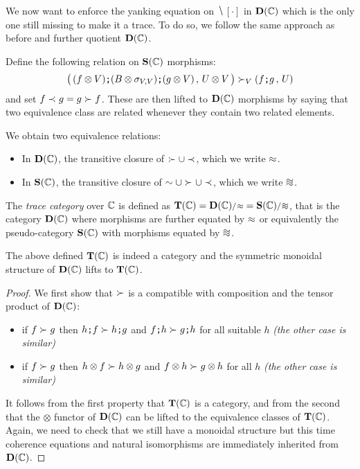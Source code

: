 

We now want to enforce the yanking equation on $\hide{}[\cdot]$ in $\mathbf D(\mathbb{C})$ which is the only one
still missing to make it a trace. To do so, we follow 
the same approach as
before and further quotient $\mathbf D(\mathbb{C})$.

\begin{definition}
	Define the following relation on $\mathbf S(\mathbb{C})$ morphisms:
	$$\big(\,(f\otimes V)\textbf{\tt;}(B\otimes\sigma_{V,V})\textbf{\tt;}(g\otimes V)\,,\, U\otimes V\,\big)
	\succ_{V} (f\textbf{\tt;} g\,,\,U) $$
	and set $f\prec_{}g=g\succ_{}f$. These are then lifted to $\mathbf D(\mathbb{C})$ morphisms by saying that two
	equivalence class are related whenever they contain two related elements.
	
	We obtain two equivalence relations:
	\begin{itemize}
		\item In $\mathbf D(\mathbb{C})$, the transitive closure of $\succ_{}\cup\prec_{}$, which we write $\approx$.
		\item In $\mathbf S(\mathbb{C})$, the transitive closure of $\sim\cup\succ_{}\cup\prec_{}$, which we write $\quo$.
	\end{itemize}
	The \emph{trace category} over $\mathbb{C}$ is defined as $\tra C=\quotient{\dial C}{\ye}
	=\quotient{\state C}{\quo}$,
	that is the category $\mathbf D(\mathbb{C})$ where morphisms are further equated by $\approx$ or equivalently
	the pseudo-category $\mathbf S(\mathbb{C})$ with morphisms equated by $\quo$.
\end{definition}




\begin{proposition}
	The above defined $\mathbf T(\mathbb{C})$ is indeed a category and
	the symmetric monoidal structure of $\mathbf D(\mathbb{C})$ lifts to $\mathbf T(\mathbb{C})$.
\end{proposition}

\begin{proof}
	We first show that $\succ_{}$ is a compatible with composition and the tensor product of $\mathbf D(\mathbb{C})$:
	\begin{itemize}
		\item if $f\succ_{}g$ then $h\textbf{\tt;} f\succ_{}h\textbf{\tt;} g$ and $f\textbf{\tt;} h\succ_{}g\textbf{\tt;} h$ for all suitable $h$
	\textit{(the other case is similar)}
		\item if $f\succ_{}g$ then $h\otimes f\succ_{}h\otimes g$ and $f\otimes h\succ_{}g\otimes h$ for all $h$
	\textit{(the other case is similar)}
	\end{itemize}
	It follows from the first property that $\mathbf T(\mathbb{C})$ is a category, and from the second that the
	$\otimes$ functor of $\mathbf D(\mathbb{C})$ can be lifted to the equivalence classes of $\mathbf T(\mathbb{C})$.
	Again, we need to check that we still have a monoidal structure but this time
	coherence equations and natural isomorphisms are immediately inherited from $\mathbf D(\mathbb{C})$.
\end{proof}


